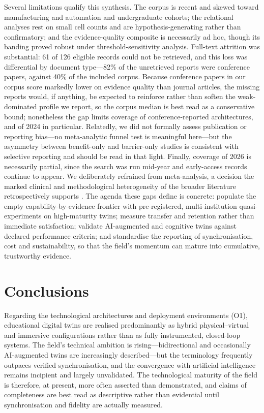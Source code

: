 Several limitations qualify this synthesis. The corpus is recent and skewed
toward manufacturing and automation and undergraduate cohorts; the
relational analyses rest on small cell counts and are hypothesis-generating rather
than confirmatory; and the evidence-quality composite is necessarily ad hoc,
though its banding proved robust under threshold-sensitivity analysis. Full-text
attrition was substantial: 61 of 126 eligible records could not be retrieved, and
this loss was differential by document type---82\% of the unretrieved reports were
conference papers, against 40\% of the included corpus. Because conference papers in
our corpus score markedly lower on evidence quality than journal articles, the
missing reports would, if anything, be expected to reinforce rather than soften the
weak-dominated profile we report, so the corpus median is best read as a
conservative bound; nonetheless the gap limits coverage of conference-reported
architectures, and of 2024 in particular. Relatedly, we did not formally assess
publication or reporting bias---no meta-analytic funnel test is meaningful here---but
the asymmetry between benefit-only and barrier-only studies is consistent with
selective reporting and should be read in that light. Finally, coverage of 2026 is
necessarily partial, since the search was run mid-year and early-access records
continue to appear. We
deliberately refrained from meta-analysis, a decision the marked clinical and
methodological heterogeneity of the broader literature retrospectively supports
\citep{widowati_meta-analysis_2025}. The agenda these gaps define is concrete: populate the
empty capability-by-evidence frontier with pre-registered, multi-institution
quasi-experiments on high-maturity twins; measure transfer and retention rather
than immediate satisfaction; validate AI-augmented and cognitive twins against
declared performance criteria; and standardise the reporting of synchronisation,
cost and sustainability, so that the field's momentum can mature into cumulative,
trustworthy evidence.

\section{Conclusions}\label{conclusions}

Regarding the technological architectures and deployment environments (O1),
educational digital twins are realised predominantly as hybrid physical--virtual
and immersive configurations rather than as fully instrumented, closed-loop
systems. The field's technical ambition is rising---bidirectional and occasionally
AI-augmented twins are increasingly described---but the terminology frequently
outpaces verified synchronisation, and the convergence with artificial
intelligence remains incipient and largely unvalidated. The technological maturity
of the field is therefore, at present, more often asserted than demonstrated, and
claims of completeness are best read as descriptive rather than evidential until
synchronisation and fidelity are actually measured.

